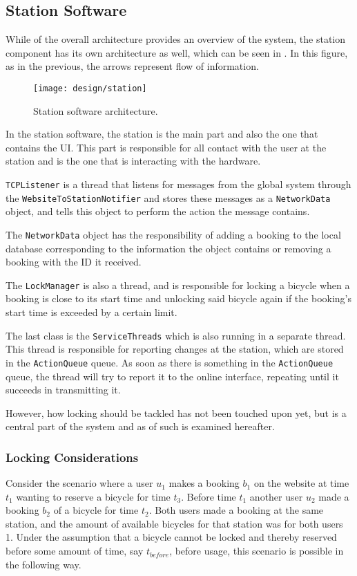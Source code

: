 \subsection{Station Software}\label{subsec:stationsoftdesfgi}
While  of the overall architecture provides an overview of the system, the station component has its own architecture as well, which can be seen in . In this figure, as in the previous, the arrows represent flow of information.

\begin{figure}[h]
	\centering
	\texttt{[image: design/station]}
	\caption{Station software architecture.}\label{fig:stationarch}
\end{figure}

In the station software, the station is the main part and also the one that contains the UI. 
This part is responsible for all contact with the user at the station and is the one that is interacting with the hardware.

\texttt{TCPListener} is a thread that listens for messages from the global system through the \texttt{WebsiteToStationNotifier} and stores these messages as a \texttt{NetworkData} object, and tells this object to perform the action the message contains.

The \texttt{NetworkData} object has the responsibility of adding a booking to the local database corresponding to the information the object contains or removing a booking with the ID it received.

The \texttt{LockManager} is also a thread, and is responsible for locking a bicycle when a booking is close to its start time and unlocking said bicycle again if the booking's start time is exceeded by a certain limit.

The last class is the \texttt{ServiceThreads} which is also running in a separate thread.
This thread is responsible for reporting changes at the station, which are stored in the \texttt{ActionQueue} queue.
As soon as there is something in the \texttt{ActionQueue} queue, the thread will try to report it to the online interface, repeating until it succeeds in transmitting it.

However, how locking should be tackled has not been touched upon yet, but is a  central part of the system and as of such is examined hereafter.

\subsubsection{Locking Considerations}\label{subsec:lockingcons}
Consider the scenario where a user $u_1$ makes a booking $b_1$ on the website at time $t_1$ wanting to reserve a bicycle for time $t_3$. Before time $t_1$ another user $u_2$ made a booking $b_2$ of a bicycle for time $t_2$. Both users made a booking at the same station, and the amount of available bicycles for that station was for both users 1. Under the assumption that a bicycle cannot be locked and thereby reserved before some amount of time, say $t_{before}$, before usage, this scenario is possible in the following way.

